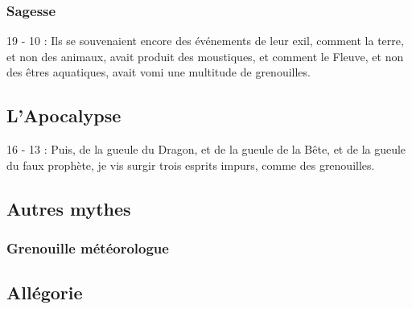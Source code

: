 \subsubsection{Sagesse}
\begin{itemsize}
\item 19 - 10 : Ils se souvenaient encore des événements de leur exil, comment la terre, et non des animaux, avait produit des moustiques, et comment le Fleuve, et non des êtres aquatiques, avait vomi une multitude de grenouilles.
\end{itemsize}
\subsection{L'Apocalypse}
\begin{itemsize}
\item 16 - 13 : Puis, de la gueule du Dragon, et de la gueule de la Bête, et de la gueule du faux prophète, je vis surgir trois esprits impurs, comme des grenouilles.
\end{itemsize}
\subsection{Autres mythes}
\subsubsection{Grenouille météorologue}
\subsection{Allégorie}
